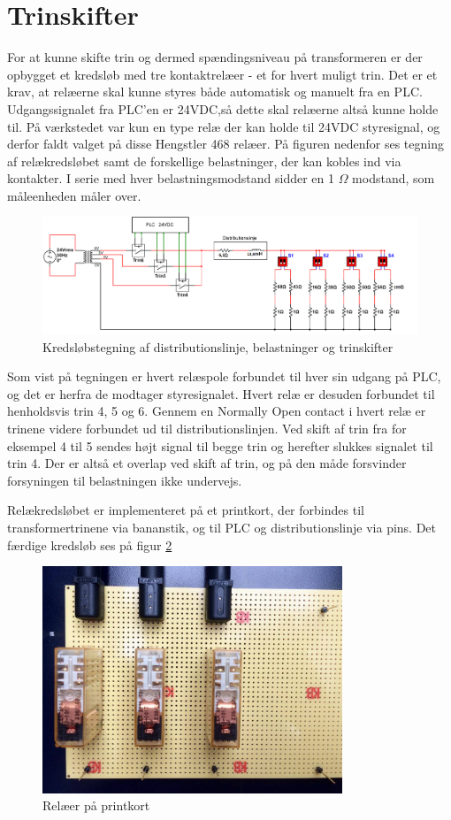 

\section{Trinskifter}
\label{sec:Trinskifter}
For at kunne skifte trin og dermed spændingsniveau på transformeren er der opbygget et kredsløb med tre kontaktrelæer - et for hvert muligt trin. Det er et krav, at relæerne skal kunne styres både automatisk og manuelt fra en PLC. Udgangssignalet fra PLC'en er 24VDC,så dette skal relæerne altså kunne holde til. På værkstedet var kun en type relæ der kan holde til 24VDC styresignal, og derfor faldt valget på disse Hengstler 468 relæer. På figuren nedenfor ses tegning af relækredsløbet samt de forskellige belastninger, der kan kobles ind via kontakter. I serie med hver belastningsmodstand sidder en 1 $\Omega$ modstand, som måleenheden måler over. 


\begin{figure}[H] 
	\centering
	\includegraphics[width=1\textwidth]{Figure/Trinskiftertegning2}
	\caption{Kredsløbstegning af distributionslinje, belastninger og trinskifter}
	\label{fig:Trinskiftertegning2}
\end{figure}

Som vist på tegningen er hvert relæspole forbundet til hver sin udgang på PLC, og det er herfra de modtager styresignalet. Hvert relæ er desuden forbundet til henholdsvis trin 4, 5 og 6. Gennem en Normally Open contact i hvert relæ er trinene videre forbundet ud til distributionslinjen. Ved skift af trin fra for eksempel 4 til 5 sendes højt signal til begge trin og herefter slukkes signalet til trin 4. Der er altså et overlap ved skift af trin, og på den måde forsvinder forsyningen til belastningen ikke undervejs. 

Relækredsløbet er implementeret på et printkort, der forbindes til transformertrinene via bananstik, og til PLC og distributionslinje via pins. Det færdige kredsløb ses på figur \ref{fig:Relaekredsloeb}

\begin{figure}[H] 
	\centering
	\includegraphics[width=0.8\textwidth]{Figure/Relaekredsl}
	\caption{Relæer på printkort}
	\label{fig:Relaekredsloeb}
\end{figure}

